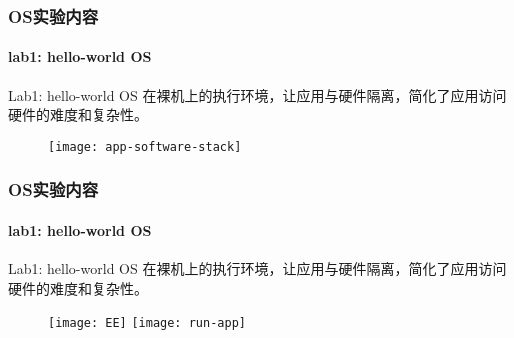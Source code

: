 \begin{frame}
    \frametitle{OS实验内容}
    \framesubtitle{lab1: hello-world OS}
    \begin{block}{Lab1:  hello-world OS}
        在裸机上的执行环境，让应用与硬件隔离，简化了应用访问硬件的难度和复杂性。
    \end{block}
    
    \begin{figure}
        \centering
        \texttt{[image: app-software-stack]} %
    \end{figure}
    
\end{frame}
\begin{frame}
    \frametitle{OS实验内容}
    \framesubtitle{lab1: hello-world OS}
    \begin{block}{Lab1:  hello-world OS}
        在裸机上的执行环境，让应用与硬件隔离，简化了应用访问硬件的难度和复杂性。
    \end{block}
    
    \begin{figure}
        \centering
        \texttt{[image: EE]} %
        \texttt{[image: run-app]}
    \end{figure}
    
\end{frame}

